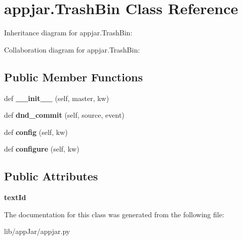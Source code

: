 \hypertarget{classappjar_1_1_trash_bin}{}\section{appjar.\+Trash\+Bin Class Reference}
\label{classappjar_1_1_trash_bin}


Inheritance diagram for appjar.\+Trash\+Bin\+:


Collaboration diagram for appjar.\+Trash\+Bin\+:
\subsection*{Public Member Functions}
\begin{DoxyCompactItemize}
\item 
\mbox{\label{classappjar_1_1_trash_bin_ae3aac254d329b03e281fec8fd0828bcd}} 
def {\bfseries \+\_\+\+\_\+init\+\_\+\+\_\+} (self, master, kw)
\item 
\mbox{\label{classappjar_1_1_trash_bin_ac77310c2bc11aca782811806542bf684}} 
def {\bfseries dnd\+\_\+commit} (self, source, event)
\item 
\mbox{\label{classappjar_1_1_trash_bin_a280f58d6954a72a1de7db36adadb082d}} 
def {\bfseries config} (self, kw)
\item 
\mbox{\label{classappjar_1_1_trash_bin_a8f533b8b5f8ea486717e078c54488cc8}} 
def {\bfseries configure} (self, kw)
\end{DoxyCompactItemize}
\subsection*{Public Attributes}
\begin{DoxyCompactItemize}
\item 
\mbox{\label{classappjar_1_1_trash_bin_aee6fbcf869bbc1df0cad74b87186b8b2}} 
{\bfseries text\+Id}
\end{DoxyCompactItemize}


The documentation for this class was generated from the following file\+:\begin{DoxyCompactItemize}
\item 
lib/app\+Jar/appjar.\+py\end{DoxyCompactItemize}
